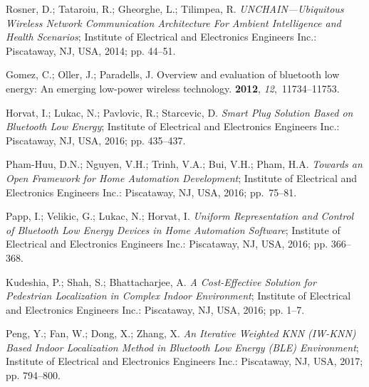 \documentclass[symmetry,article,accept,moreauthors,pdftex10pt,a4paper]{mdpi}
\begin{document}
\begin{thebibliography}{999}
Rosner, D.; Tataroiu, R.; Gheorghe, L.; Tilimpea, R.
\newblock \emph{UNCHAIN---Ubiquitous Wireless Network Communication Architecture For
	Ambient Intelligence and Health Scenarios};
\newblock Institute of Electrical and Electronics Engineers Inc.: Piscataway, NJ, USA, 2014; pp.
44--51.

Gomez, C.; Oller, J.; Paradells, J.
\newblock Overview and evaluation of bluetooth low energy: An emerging
low-power wireless technology.
 {\bf 2012}, {\em 12},~11734--11753.

Horvat, I.; Lukac, N.; Pavlovic, R.; Starcevic, D.
\newblock \emph{Smart Plug Solution Based on Bluetooth Low Energy};
\newblock Institute of Electrical and Electronics Engineers Inc.: Piscataway, NJ, USA, 2016; pp.
435--437.

Pham-Huu, D.N.; Nguyen, V.H.; Trinh, V.A.; Bui, V.H.; Pham, H.A.
\newblock \emph{Towards an Open Framework for Home Automation Development};
\newblock Institute of Electrical and Electronics Engineers Inc.: Piscataway, NJ, USA, 2016; pp.~75--81.

Papp, I.; Velikic, G.; Lukac, N.; Horvat, I.
\newblock \emph{Uniform Representation and Control of Bluetooth Low Energy Devices in
	Home Automation Software};
\newblock Institute of Electrical and Electronics Engineers Inc.: Piscataway, NJ, USA, 2016; pp.
366--368.

Kudeshia, P.; Shah, S.; Bhattacharjee, A.
\newblock \emph{A Cost-Effective Solution for Pedestrian Localization in Complex
	Indoor Environment};
\newblock Institute of Electrical and Electronics Engineers Inc.: Piscataway, NJ, USA, 2016; pp.
1--7.

Peng, Y.; Fan, W.; Dong, X.; Zhang, X.
\newblock \emph{An Iterative Weighted KNN (IW-KNN) Based Indoor Localization Method
	in Bluetooth Low Energy (BLE) Environment};
\newblock Institute of Electrical and Electronics Engineers Inc.: Piscataway, NJ, USA, 2017; pp.
794--800.


\end{thebibliography}
\end{document}
